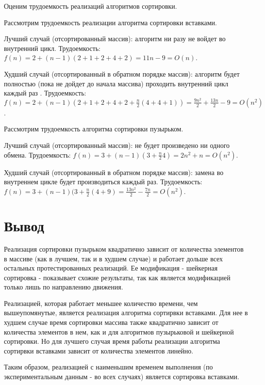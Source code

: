 Оценим трудоемкость реализаций алгоритмов сортировки.

Рассмотрим трудоемкость реализации алгоритма сортировки вставками.

Лучший случай (отсортированный массив): алгоритм ни разу не войдет во внутренний цикл. Трудоемкость: $f(n) = 2 + (n - 1)(2 + 1 + 2 + 4 + 2) =  11n - 9 = O(n)$.

Худший случай (отсортированный в обратном порядке массив): алгоритм будет полностью (пока не дойдет до начала массива) проходить внутренний цикл каждый раз . Трудоемкость: $f(n) = 2 + (n - 1)(2 + 1 + 2 + 4 + 2 + \frac{n}{2} (4 + 4 + 1)) =  \frac{9n^2}{2} + \frac{13n}{2} - 9 = O(n^2)$.


Рассмотрим трудоемкость алгоритма сортировки пузырьком.

Лучший случай (отсортированный массив): не будет произведено ни одного обмена. Трудоемкость: $f(n) = 3 + (n - 1)(3 + \frac{n}{2} 4) = 2n^2 + n = O(n^2)$.

Худший случай (отсортированный в обратном порядке массив): замена во внутреннем цикле будет производиться каждый раз. Трудоемкость: $f(n) = 3 + (n - 1)(3 + \frac{n}{2} (4 + 9) = \frac{13n^2}{2} - \frac{7n}{2} = O(n^2)$.



\section*{Вывод}

Реализация сортировки пузырьком квадратично зависит от количества элементов в массиве (как в лучшем, так и в худшем случае) и работает дольше всех остальных протестированных реализаций. Ее модификация - шейкерная сортировка - показывает схожие результаты, так как является модификацией только лишь по направлению движения. 

Реализацией, которая работает меньшее количество времени, чем вышеупомянутые, является реализация алгоритма сортирвки вставками. Для нее в худшем случае время сортировки массива также квадратично зависит от количества элементов в нем, как и для алгоритмов пузырьковой и шейкерной сортировки. Но для лучшего случая время работы реализации алгоритма сортирвки вставками зависит от количества элементов линейно.

Таким образом, реализацией с наименьшим временем выполнения (по экспериментальным данным - во всех случаях) является сортировка вставками.
